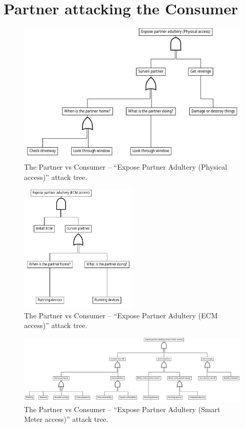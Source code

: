 
\section{Partner attacking the Consumer}
\begin{figure}[h]
  \centering
	\includegraphics[width=.75\textwidth]{figures/graphviz/partner_vs_consumer_physical.pdf}
	\caption{The Partner vs Consumer -- ``Expose Partner Adultery (Physical access)'' attack tree.}
	\label{fig:attack_trees:partner:cheater_physical}
\end{figure}

\begin{figure}[h]
  \centering
  \includegraphics[width=0.5\textwidth]{figures/graphviz/partner_vs_consumer_ecm.pdf}
  \caption{The Partner vs Consumer -- ``Expose Partner Adultery (ECM access)'' attack tree.}
  \label{fig:attack_trees:partner:cheater_ecm}
\end{figure}

\begin{figure}[h]
  \centering
  \includegraphics[angle=90,height=\textheight]{figures/graphviz/partner_vs_consumer_sm.pdf}
  \caption{The Partner vs Consumer -- ``Expose Partner Adultery (Smart Meter access)'' attack tree.}
  \label{fig:attack_trees:partner:cheater_sm}
\end{figure}

